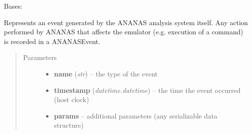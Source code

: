 \documentclass[letterpaper,10pt,english]{sphinxmanual}
\begin{document}
\begin{fulllineitems}
\label{ambrosia_plugins.events:ambrosia_plugins.events.ANANASEvent}
Bases: {\hyperref[ambrosia.model:ambrosia.model.Event]{}}

Represents an event generated by the ANANAS analysis system itself. Any action performed by ANANAS that affects
the emulator (e.g. execution of a command) is recorded in a ANANASEvent.
\begin{quote}\begin{description}
\item[{Parameters}] \leavevmode\begin{itemize}
\item {} 
\textbf{name} (\emph{str}) -- the type of the event

\item {} 
\textbf{timestamp} (\emph{datetime.datetime}) -- the time the event occurred (host clock)

\item {} 
\textbf{params} -- additional parameters (any serializable data structure)

\end{itemize}

\end{description}\end{quote}

\begin{fulllineitems}
\label{ambrosia_plugins.events:ambrosia_plugins.events.ANANASEvent.get_serializeable_properties}
\end{fulllineitems}


\begin{fulllineitems}
\label{ambrosia_plugins.events:ambrosia_plugins.events.ANANASEvent.indices}
\end{fulllineitems}


\end{fulllineitems}

\end{document}

